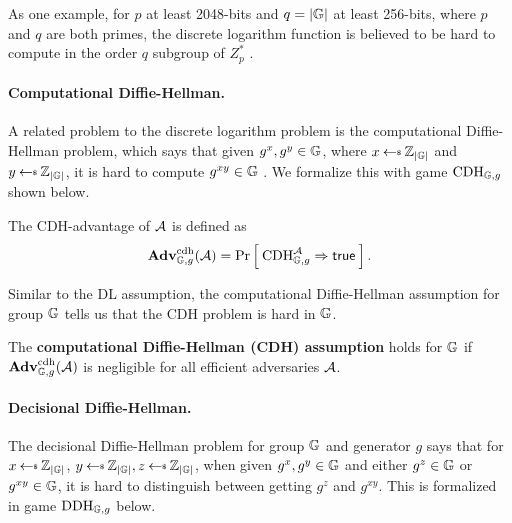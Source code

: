 As one example, for $p$ at least 2048-bits and $q = |\mathbb{G}|$ at least 256-bits, where $p$ and $q$ are both primes, the discrete logarithm function is believed to be hard to compute in the order $q$ subgroup of $Z_p^*$ \cite{BonehShoupBook}.

\paragraph{Computational Diffie-Hellman.} A related problem to the discrete logarithm problem is the computational Diffie-Hellman problem, which says that given $g^x, g^y \in \mathbb{G}$, where $x \getsr \Z_{|\group|}$ and $y \getsr \Z_{|\group|}$, it is hard to compute $g^{xy} \in \mathbb{G}$ \cite{BonehShoupBook}. We formalize this with game $\textnormal{CDH}_{\mathbb{G}, g}$ shown below.  

\begin{center}
\end{center}

The CDH-advantage of ${\mathcal A}$ is defined as 
\begin{equation*}
\mathbf{Adv}^{\mathrm{cdh}}_{\mathbb{G}, g}({\mathcal A}) = \Pr\left[\: \textnormal{CDH}^{\mathcal A}_{\mathbb{G}, g}\Rightarrow\mathsf{true} \:\right].
\end{equation*}

Similar to the DL assumption, the computational Diffie-Hellman assumption for group $\mathbb{G}$ tells us that the CDH problem is hard in $\mathbb{G}$.

\begin{definition}
	The \textbf{computational Diffie-Hellman (CDH) assumption} holds for $\mathbb{G}$ if $\mathbf{Adv}^{\mathrm{cdh}}_{\mathbb{G}, g}({\mathcal A})$ is negligible for all efficient adversaries ${\mathcal A}$.
\end{definition}

\paragraph{Decisional Diffie-Hellman.} The decisional Diffie-Hellman problem for group $\mathbb{G}$ and generator $g$ says that for $x \getsr \Z_{|\group|}$, $y \getsr \Z_{|\group|}, z \getsr \Z_{|\group|}$, when given $g^x,g^y \in \mathbb{G}$ and either $g^z \in \mathbb{G}$ or $g^{xy} \in \mathbb{G}$, it is hard to distinguish between getting $g^z$ and $g^{xy}$. This is formalized in game $\textnormal{DDH}_{\mathbb{G},g}$ below.  

